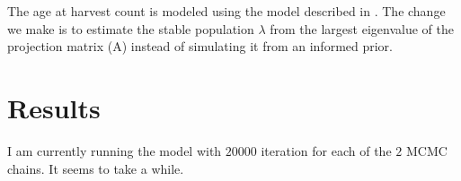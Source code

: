 \documentclass[
]{article}
\begin{document}
The age at harvest count is modeled using the model described in
\citep{skelly2023flexible}. The change we make is to estimate the stable
population \(\lambda\) from the largest eigenvalue of the projection
matrix (A) instead of simulating it from an informed prior.

\hypertarget{results}{%
\section{Results}\label{results}}

I am currently running the model with \(20000\) iteration for each of
the \(2\) MCMC chains. It seems to take a while.


  
\end{document}
